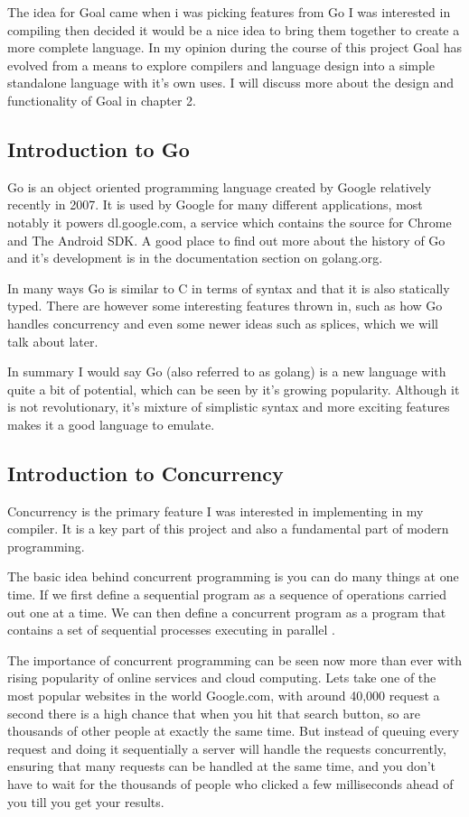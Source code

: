 The idea for Goal came when i was picking features from Go I was interested in compiling then decided it would be a nice idea to bring them together to create a more complete language. In my opinion during the course of this project Goal has evolved from a means to explore compilers and language design into a simple standalone language with it's own uses. I will discuss more about the design and functionality of Goal in chapter 2.


\subsection{Introduction to Go}

Go is an object oriented programming language created by Google relatively recently in 2007. It is used by Google for many different applications, most notably it powers dl.google.com, a service which contains the source for Chrome and The Android SDK. A good place to find out more about the history of Go and it's development is in the documentation section on golang.org.

In many ways Go is similar to C in terms of syntax and that it is also statically typed. There are however some interesting features thrown in, such as how Go handles concurrency and even some newer ideas such as splices, which we will talk about later.

In summary I would say Go (also referred to as golang) is a new language with quite a bit of potential, which can be seen by it's growing popularity. Although it is not revolutionary, it's mixture of simplistic syntax and more exciting features makes it a good language to emulate.

\subsection{Introduction to Concurrency}

Concurrency is the primary feature I was interested in implementing in my compiler. It is a key part of this project and also a fundamental part of modern programming. 

The basic idea behind concurrent programming is you can do many things at one time. If we first define a sequential program as a sequence of operations carried out one at a time. We can then define a concurrent program as a program that contains a set of sequential processes executing in parallel \cite[p.~414]{CompGen1997}.

The importance of concurrent programming can be seen now more than ever with rising popularity of online services and cloud computing. Lets take one of the most popular websites in the world Google.com, with around 40,000 request a second there is a high chance that when you hit that search button, so are thousands of other people at exactly the same time. But instead of queuing every request and doing it sequentially a server will handle the requests concurrently, ensuring that many requests can be handled at the same time, and you don't have to wait for the thousands of people who clicked a few milliseconds ahead of you till you get your results.

